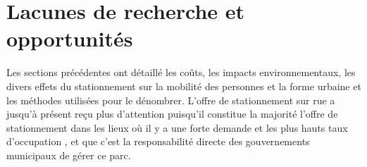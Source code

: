   \section{Lacunes de recherche et opportunités}\label{sec:lacunes-recherche}
    Les sections précédentes ont détaillé les coûts, les impacts environnementaux, les divers effets du stationnement sur la mobilité des personnes et la forme urbaine et les méthodes utilisées pour le dénombrer. L'offre de stationnement sur rue a jusqu'à présent reçu plus d'attention \parencite{bourdeau_methodologie_2014,open_mobility_foundation_curb_2024-1,eros_curblr_2025} puisqu'il constitue la majorité l'offre de stationnement dans les lieux où il y a une forte demande et les plus hauts taux d'occupation \parencite{morency_stationnement_2017,aignel_elaboration_2015}, et que c'est la responsabilité directe des gouvernements municipaux de gérer ce parc.\par

